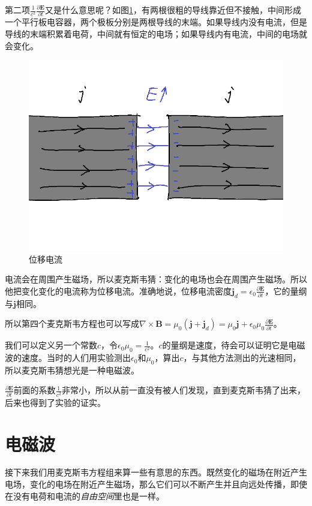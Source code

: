 第二项$\frac{1}{c^2} \frac{\partial \mathbf{E}}{\partial t}$又是什么意思呢？如图\ref{fig-disp-curr}，有两根很粗的导线靠近但不接触，中间形成一个平行板电容器，两个极板分别是两根导线的末端。如果导线内没有电流，但是导线的末端积累着电荷，中间就有恒定的电场；如果导线内有电流，中间的电场就会变化。
\begin{figure}[htb]
\centering
\includegraphics[scale=0.5]{fig/disp-curr.png}
\caption{位移电流}
\label{fig-disp-curr}
\end{figure}

电流会在周围产生磁场，所以麦克斯韦猜：变化的电场也会在周围产生磁场。所以他把变化变化的电流称为位移电流。准确地说，位移电流密度$\mathbf{j}_d=\epsilon_0 \frac{\partial \mathbf{E}}{\partial t}$，它的量纲与$\mathbf{j}$相同。

所以第四个麦克斯韦方程也可以写成$\nabla \times \mathbf{B}=\mu_0 (\mathbf{j}+\mathbf{j}_d)=\mu_0 \mathbf{j}+\epsilon_0 \mu_0 \frac{\partial \mathbf{E}}{\partial t}$。

我们可以定义另一个常数$c$，令$\epsilon_0 \mu_0=\frac{1}{c^2}$。$c$的量纲是速度，待会可以证明它是电磁波的速度。当时的人们用实验测出$\epsilon_0$和$\mu_0$，算出$c$，与其他方法测出的光速相同，所以麦克斯韦猜想光是一种电磁波。

$\frac{\partial \mathbf{E}}{\partial t}$前面的系数$\frac{1}{c^2}$非常小，所以从前一直没有被人们发现，直到麦克斯韦猜了出来，后来也得到了实验的证实。
\section{电磁波}
接下来我们用麦克斯韦方程组来算一些有意思的东西。既然变化的磁场在附近产生电场，变化的电场在附近产生磁场，那么它们可以不断产生并且向远处传播，即使在没有电荷和电流的\emph{自由空间}里也是一样。

